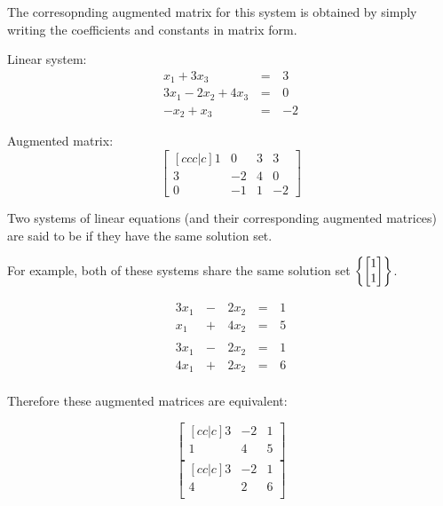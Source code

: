 \begin{applicationActivities}
\begin{example}
  The corresopnding augmented matrix for this system is obtained by
  simply writing the coefficients and constants in matrix form.

  \begin{multicols}{2}
    Linear system:
    \begin{alignat*}{2}
       x_1 + 3x_3 &\,=\,& 3 \\
      3x_1 - 2x_2 + 4x_3 &\,=\,& 0 \\
      -x_2 +  x_3 &\,=\,& -2
    \end{alignat*}

    \columnbreak

    Augmented matrix:
    \[
      \begin{bmatrix}[ccc|c]
        1 & 0 & 3 & 3 \\
        3 & -2 & 4 & 0 \\
        0 & -1 & 1 & -2
      \end{bmatrix}
    \]
  \end{multicols}
\end{example}

\begin{definition}
  Two systems of linear equations (and their corresponding augmented
  matrices) are said to be  if they have the same
  solution set.

  For example, both of these systems share the same solution set
  \(\left\{ \begin{bmatrix} 1 \\ 1\end{bmatrix} \right\}\).

  \begin{multicols}{2}\noindent
    \begin{alignat*}{3}
      3x_1 &\,-\,& 2x_2 &\,=\,& 1 \\
      x_1 &\,+\,& 4x_2 &\,=\,& 5 \\
    \end{alignat*}
    \begin{alignat*}{3}
      3x_1 &\,-\,& 2x_2 &\,=\,& 1 \\
      4x_1 &\,+\,& 2x_2 &\,=\,& 6 \\
    \end{alignat*}
  \end{multicols}

  Therefore these augmented matrices are equivalent:

  \begin{multicols}{2}\noindent
    \[
      \begin{bmatrix}[cc|c]
        3 & -2 & 1\\
        1 &  4 & 5\\
      \end{bmatrix}
    \]
    \[
      \begin{bmatrix}[cc|c]
        3 & -2 & 1\\
        4 &  2 & 6\\
      \end{bmatrix}
    \]
  \end{multicols}
\end{definition}


\end{applicationActivities}
